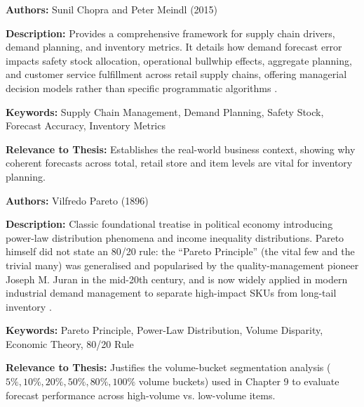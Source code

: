 
{

	\textbf{Authors:}
	Sunil Chopra and Peter Meindl (2015)

	\textbf{Description:}
	Provides a comprehensive framework for supply chain drivers, demand planning, and inventory metrics. It details how demand forecast error impacts safety stock allocation, operational bullwhip effects, aggregate planning, and customer service fulfillment across retail supply chains, offering managerial decision models rather than specific programmatic algorithms \autocite{Chopra:2015}.

	\textbf{Keywords:}
	Supply Chain Management, Demand Planning, Safety Stock, Forecast Accuracy, Inventory Metrics

	\textbf{Relevance to Thesis:}
	Establishes the real-world business context, showing why coherent forecasts across total, retail store and item levels are vital for inventory planning.

}

{

	\textbf{Authors:}
	Vilfredo Pareto (1896)

	\textbf{Description:}
	Classic foundational treatise in political economy introducing power-law distribution phenomena and income inequality distributions. Pareto himself did not state an 80/20 rule: the ``Pareto Principle'' (the vital few and the trivial many) was generalised and popularised by the quality-management pioneer Joseph M. Juran in the mid-20th century, and is now widely applied in modern industrial demand management to separate high-impact SKUs from long-tail inventory \autocite{Pareto:1896}.

	\textbf{Keywords:}
	Pareto Principle, Power-Law Distribution, Volume Disparity, Economic Theory, 80/20 Rule

	\textbf{Relevance to Thesis:}
	Justifies the volume-bucket segmentation analysis (\(5\%, 10\%, 20\%, 50\%, 80\%, 100\%\) volume buckets) used in Chapter 9 to evaluate forecast performance across high-volume vs. low-volume items.

}

